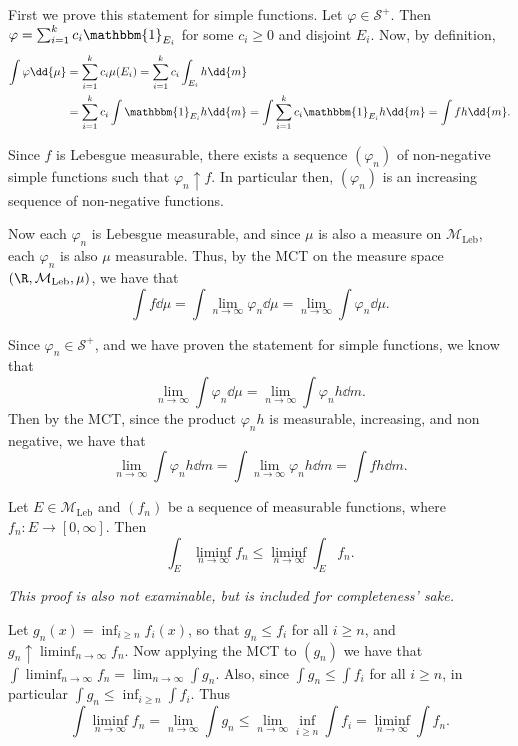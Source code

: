 \documentclass{maths}
\newcommand{\mleb}{\mathcal{M}_{\text{Leb}}}
\newcommand{\smpl}{\mathcal{S}}
\newcommand{\ind}{\mathbbm{1}}
\begin{document}
\begin{prf}
    First we prove this statement for simple functions.
    Let $\varphi\in\smpl^+$.
    Then $\varphi=\sum_{i=1}^k c_i\ind_{E_i}$ for some $c_i\geqslant0$ and disjoint $E_i$.
    Now, by definition,
    \begin{align*}
        \int \varphi \dd{\mu}
        &= \sum_{i=1}^k c_i\mu(E_i)
        = \sum_{i=1}^k c_i \int_{E_i} h \dd{m}\\
        &= \sum_{i=1}^k c_i \int \ind_{E_i} h \dd{m}
        = \int \sum_{i=1}^k c_i\ind_{E_i} h \dd{m}
        = \int fh \dd{m}.
    \end{align*}

    Since $f$ is Lebesgue measurable, there exists a sequence $(\varphi_n)$ of non-negative simple functions such that $\varphi_n\uparrow f$.
    In particular then, $(\varphi_n)$ is an increasing sequence of non-negative functions.

    Now each $\varphi_n$ is Lebesgue measurable, and since $\mu$ is also a measure on $\mleb$, each $\varphi_n$ is also $\mu$ measurable.
    Thus, by the MCT on the measure space $(\R,\mleb,\mu)$, we have that
    \[
        \int f \dd{\mu} =
        \int \lim_{n\to\infty} \varphi_n \dd{\mu} =
        \lim_{n\to\infty} \int \varphi_n \dd{\mu}.
    \]

    Since $\varphi_n\in\smpl^+$, and we have proven the statement for simple functions, we know that
    \[
        \lim_{n\to\infty} \int \varphi_n \dd{\mu} =
        \lim_{n\to\infty} \int \varphi_n h \dd{m}.
    \]
    Then by the MCT, since the product $\varphi_n h$ is measurable, increasing, and non negative, we have that
    \[
        \lim_{n\to\infty} \int \varphi_n h \dd{m} =
        \int \lim_{n\to\infty} \varphi_n h \dd{m} =
        \int f h \dd{m}.
    \]
\end{prf}

\begin{thm}
    Let $E\in\mleb$ and $(f_n)$ be a sequence of measurable functions, where $f_n\colon E\to[0,\infty]$.
    Then
    \[
        \int_E \liminf_{n\to\infty} f_n \leqslant
        \liminf_{n\to\infty} \int_E f_n.
    \]
\end{thm}

\begin{prf}
    \emph{This proof is also not examinable, but is included for completeness' sake.}

    Let $g_n(x)=\inf_{i\geqslant n} f_i(x)$, so that $g_n\leqslant f_i$ for all $i\geqslant n$, and $g_n\uparrow \liminf_{n\to\infty} f_n$.
    Now applying the MCT to $(g_n)$ we have that $\int\liminf_{n\to\infty} f_n = \lim_{n\to\infty} \int g_n$.
    Also, since $\int g_n\leqslant \int f_i$ for all $i\geqslant n$, in particular $\int g_n\leqslant \inf_{i\geqslant n} \int f_i$.
    Thus
    \[
        \int \liminf_{n\to\infty} f_n =
        \lim_{n\to\infty} \int g_n \leqslant
        \lim_{n\to\infty} \inf_{i\geqslant n} \int f_i =
        \liminf_{n\to\infty} \int f_n.
    \]
\end{prf}
\end{document}
